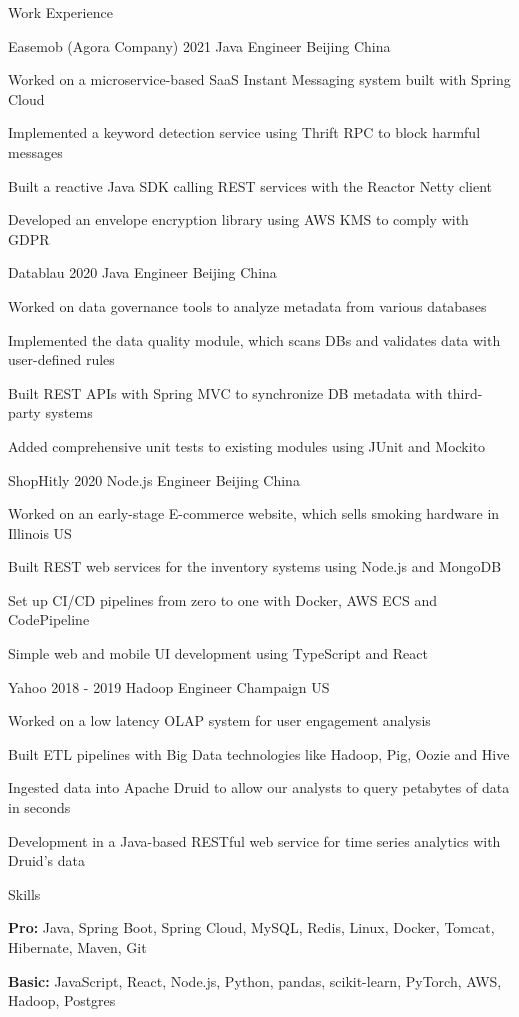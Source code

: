 \documentclass{resume} %
\begin{document}
\begin{rSection}{Work Experience}

\begin{rSubsection}
{Easemob (Agora Company)} {2021} {Java Engineer} {Beijing China}
\item Worked on a microservice-based SaaS Instant Messaging system built with Spring Cloud
\item Implemented a keyword detection service using Thrift RPC to block harmful messages
\item Built a reactive Java SDK calling REST services with the Reactor Netty client
\item Developed an envelope encryption library using AWS KMS to comply with GDPR
\end{rSubsection}

\begin{rSubsection}
{Datablau} {2020} {Java Engineer} {Beijing China}
\item Worked on data governance tools to analyze metadata from various databases
\item Implemented the data quality module, which scans DBs and validates data with user-defined rules
\item Built REST APIs with Spring MVC to synchronize DB metadata with third-party systems
\item Added comprehensive unit tests to existing modules using JUnit and Mockito
\end{rSubsection}

\begin{rSubsection}
{ShopHitly} {2020} {Node.js Engineer} {Beijing China}
\item Worked on an early-stage E-commerce website, which sells smoking hardware in Illinois US
\item Built REST web services for the inventory systems using Node.js and MongoDB
\item Set up CI/CD pipelines from zero to one with Docker, AWS ECS and CodePipeline
\item Simple web and mobile UI development using TypeScript and React
\end{rSubsection}

\begin{rSubsection}
{Yahoo} {2018 - 2019} {Hadoop Engineer} {Champaign US}
\item Worked on a low latency OLAP system for user engagement analysis
\item Built ETL pipelines with Big Data technologies like Hadoop, Pig, Oozie and Hive
\item Ingested data into Apache Druid to allow our analysts to query petabytes of data in seconds
\item Development in a Java-based RESTful web service for time series analytics with Druid's data
\end{rSubsection}

\end{rSection}

\begin{skillSection}{Skills}
\item {\bf Pro:} Java, Spring Boot, Spring Cloud, MySQL, Redis, Linux, Docker, Tomcat, Hibernate, Maven, Git
\item {\bf Basic:} JavaScript, React, Node.js, Python, pandas, scikit-learn, PyTorch, AWS, Hadoop, Postgres
\end{skillSection}
\end{document}
